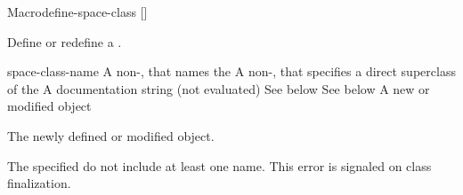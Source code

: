 \documentclass[10pt,twoside,english,pdftex]{article}
\begin{document}
\begin{functiondoc}{Macro}{define-space-class}%
   { 
     []
     }
%
%
%

\fnsyntax

\fnpurpose Define or redefine a .

\fnpackage {}

\fnmodule {}

\fnargs
\begin{args}{space-class-name}
 A non-\nil,  that names the
 A non-\nil,  that specifies a
direct superclass of the    
\arg[documentation] A documentation string (not evaluated)
 See below
 See below
 A new or modified  object
\end{args}

\fnreturns The newly defined or modified  object.

\fnerrors The specified  do not include at least
one  name.  This error is signaled on class finalization.


\end{functiondoc}
\end{document}
